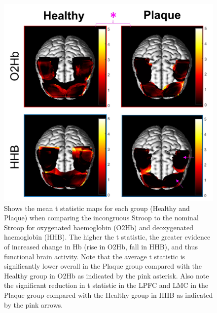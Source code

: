 \documentclass[12pt]{spieman}  %
\begin{document}
\begin{spacing}{2}
\begin{figure}
\begin{center}
\includegraphics[width = \linewidth]{Fig3_Results.jpg}
\end{center}
\caption 
{\label{fig:Results} Shows the mean t statistic maps for each group (Healthy and Plaque) when comparing the incongruous Stroop to the nominal Stroop for oxygenated haemoglobin (O2Hb) and deoxygenated haemoglobin (HHB). The higher the t statistic, the greater evidence of increased change in Hb (rise in O2Hb, fall in HHB), and thus functional brain activity. Note that the average t statistic is significantly lower overall in the Plaque group compared with the Healthy group in O2Hb as indicated by the pink asterisk. Also note the significant reduction in t statistic in the LPFC and LMC in the Plaque group compared with the Healthy group in HHB as indicated by the pink arrows. } 
\end{figure} 




\end{spacing}
\end{document}
